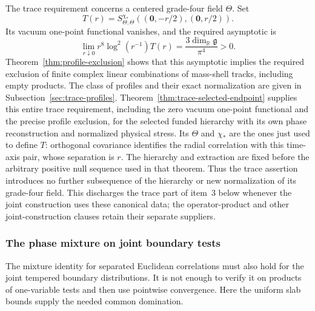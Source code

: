 The trace requirement concerns a centered grade-four field \(\Theta\).
Set
\[
 T(r)=S^{\chi_*}_{\Theta,\Theta}
            ((\boldsymbol0,-r/2),(\boldsymbol0,r/2)).
\]
Its vacuum one-point functional vanishes, and the required asymptotic is
\begin{equation}\label{ex-trace-limit}
 \lim_{r\downarrow0}r^8\log^2(r^{-1})T(r)
       =\frac{3\dim_{\mathbb R}\mathfrak g}{\pi^4}>0.
\end{equation}
Theorem~\ref{thm:profile-exclusion} shows that this asymptotic implies the
required exclusion of finite complex linear combinations of mass-shell
tracks, including empty products. The class of profiles and their exact
normalization are given in Subsection~\ref{sec:trace-profiles}.
Theorem~\ref{thm:trace-selected-endpoint} supplies this entire trace
requirement, including the zero vacuum one-point functional and the
precise profile exclusion, for the selected funded hierarchy with its
own phase reconstruction and normalized physical stress. Its $\Theta$
and $\chi_*$ are the ones just used to define $T$: orthogonal covariance
identifies the radial correlation with this time-axis pair, whose
separation is $r$. The hierarchy and extraction are fixed before the
arbitrary positive null sequence used in that theorem. Thus the trace
assertion introduces no further subsequence of the hierarchy or new
normalization of its grade-four field. This discharges the trace part
of item~3 below whenever the joint construction uses these canonical
data; the operator-product and other joint-construction clauses retain
their separate suppliers.

\subsubsection{The phase mixture on joint boundary tests}

The mixture identity for separated Euclidean correlations must also hold
for the joint tempered boundary distributions. It is not enough to verify
it on products of one-variable tests and then use pointwise convergence.
Here the uniform slab bounds supply the needed common domination.


